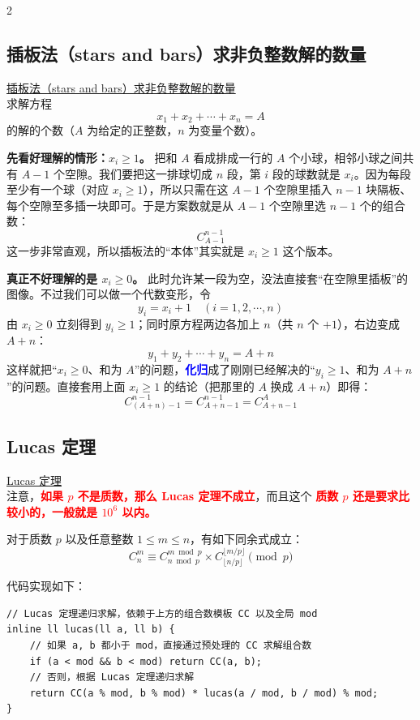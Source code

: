 \begin{multicols*}{2}
		\subsection{插板法（stars and bars）求非负整数解的数量}
		\href{https://www.notion.so/stars-and-bars-3294539447bd8055a9e7fa3cac84be9e}{插板法（stars and bars）求非负整数解的数量} \\
		求解方程
		$$x_1 + x_2 + \cdots + x_n = A$$
		的解的个数（$A$ 为给定的正整数，$n$ 为变量个数）。

		\textbf{先看好理解的情形：$x_i \ge 1$。} 把和 $A$ 看成排成一行的 $A$ 个小球，相邻小球之间共有 $A - 1$ 个空隙。我们要把这一排球切成 $n$ 段，第 $i$ 段的球数就是 $x_i$。因为每段至少有一个球（对应 $x_i \ge 1$），所以只需在这 $A - 1$ 个空隙里插入 $n - 1$ 块隔板、每个空隙至多插一块即可。于是方案数就是从 $A - 1$ 个空隙里选 $n - 1$ 个的组合数：
		$$C_{A - 1}^{n - 1}$$
		这一步非常直观，所以插板法的“本体”其实就是 $x_i \ge 1$ 这个版本。

		\textbf{真正不好理解的是 $x_i \ge 0$。} 此时允许某一段为空，没法直接套“在空隙里插板”的图像。不过我们可以做一个代数变形，令
		$$y_i = x_i + 1 \quad (i = 1, 2, \cdots, n)$$
		由 $x_i \ge 0$ 立刻得到 $y_i \ge 1$；同时原方程两边各加上 $n$（共 $n$ 个 $+1$），右边变成 $A + n$：
		$$y_1 + y_2 + \cdots + y_n = A + n$$
		这样就把“$x_i \ge 0$、和为 $A$”的问题，\textcolor{blue}{\textbf{化归}}成了刚刚已经解决的“$y_i \ge 1$、和为 $A + n$”的问题。直接套用上面 $x_i \ge 1$ 的结论（把那里的 $A$ 换成 $A + n$）即得：
		$$C_{(A + n) - 1}^{n - 1} = C_{A + n - 1}^{n - 1} = C_{A + n - 1}^{A}$$

		\subsection{Lucas 定理}
		\href{https://www.notion.so/Lucas-3394539447bd804eaaeed232c7f86b4e}{Lucas 定理} \\
		注意，\textcolor{red}{\textbf{如果 $p$ 不是质数，那么 Lucas 定理不成立}}，而且这个 \textcolor{red}{\textbf{质数 $p$ 还是要求比较小的，一般就是 $10^6$ 以内。}}

		对于质数 $p$ 以及任意整数 $1 \le m \le n$，有如下同余式成立：
		$$C_{n}^{m} \equiv C_{n \bmod p}^{m \bmod p} \times C_{\lfloor n / p \rfloor}^{\lfloor m / p \rfloor} \pmod p$$

		代码实现如下：

		\begin{verbatim}
// Lucas 定理递归求解，依赖于上方的组合数模板 CC 以及全局 mod
inline ll lucas(ll a, ll b) {
	// 如果 a, b 都小于 mod，直接通过预处理的 CC 求解组合数
	if (a < mod && b < mod) return CC(a, b);
	// 否则，根据 Lucas 定理递归求解
	return CC(a % mod, b % mod) * lucas(a / mod, b / mod) % mod;
}
		\end{verbatim}


\end{multicols*}
